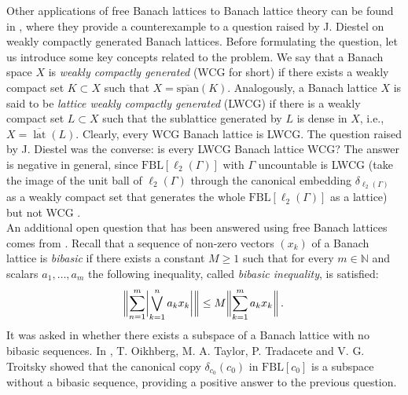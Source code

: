 \documentclass[12pt,leqno]{amsart}
\numberwithin{equation}{section} %
\theoremstyle{definition}
\numberwithin{equation}{section}
\newcommand{\N}{\mathbb{N}}
\newcommand{\spn}{\mathrm{span}}
\newcommand{\fbl}{\mathrm{FBL}}
\DeclareMathOperator*{\latt}{\text{lat}}
\begin{document}
Other applications of free Banach lattices to Banach lattice theory can be found in \cite{ART}, where they provide a counterexample to a question raised by J. Diestel on weakly compactly generated Banach lattices. Before formulating the question, let us introduce some key concepts related to the problem. We say that a Banach space $X$ is \textit{weakly compactly generated} (WCG for short) if there exists a weakly compact set $K\subset X$ such that $X=\overline{\spn}(K)$. Analogously, a Banach lattice $X$ is said to be \textit{lattice weakly compactly generated} (LWCG) if there is a weakly compact set $L\subset X$ such that the sublattice generated by $L$ is dense in $X$, i.e., $X=\overline{\latt}(L)$. Clearly, every WCG Banach lattice is LWCG. The question raised by J. Diestel was the converse: is every LWCG Banach lattice WCG? The answer is negative in general, since $\fbl[\ell_2(\Gamma)]$ with $\Gamma$ uncountable is LWCG (take the image of the unit ball of $\ell_2(\Gamma)$ through the canonical embedding $\delta_{\ell_2(\Gamma)}$ as a weakly compact set that generates the whole $\fbl[\ell_2(\Gamma)]$ as a lattice) but not WCG \cite{ART}.\\

An additional open question that has been answered using free Banach lattices comes from \cite{TT}. Recall that a sequence of non-zero vectors $(x_k)$ of a Banach lattice is \textit{bibasic} if there exists a constant $M\geq 1$ such that for every $m\in \N$ and scalars $a_1,\ldots,a_m$ the following inequality, called \textit{bibasic inequality}, is satisfied:
\begin{equation*}
    \norm[3]{\sum_{n=1}^m\abs[3]{\bigvee_{k=1}^n a_k x_k}} \leq M\norm[3]{\sum_{k=1}^m a_kx_k}.
\end{equation*}
It was asked in \cite[Remark 4.4]{TT} whether there exists a subspace of a Banach lattice with no bibasic sequences. In \cite[Theorem 7.5]{OTTT}, T. Oikhberg, M. A. Taylor, P. Tradacete and V. G. Troitsky showed that the canonical copy $\delta_{c_0}(c_0)$ in $\fbl[c_0]$ is a subspace without a bibasic sequence, providing a positive answer to the previous question.\\
\end{document}
